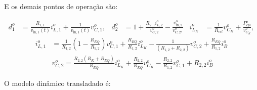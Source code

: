 E os demais pontos de operação são:

\begin{align}
  d_1^o     & = \frac{R_{1,1}}{v_{\text{in}, 1}(t)} i_{L,1}^o + \frac{1}{v_{\text{in}, 1}(t)} v_{C,1}^o, &
  d_2^o     & = 1 + \frac{R_{2,1}i_{L,2}^o}{v_{C,2}^o} - \frac{v_{\text{in},2}^o}{v_{C,2}^o,}                        &
  i_{L_K}^o & = \frac{1}{R_{crl}} v_{C_K}^o + \frac{P_{cpl}^o}{v_{C_K}^o},
\end{align}
\begin{align}
  i_{L,1}^o & = \frac{1}{R_{1,2}} \left(1 - \frac{R_{EQ}}{{R_{1,2}}}\right) v_{C,1}^o + \frac{R_{EQ}}{R_{1,2} } i_{L_K}^o - \frac{1}{ (R_{1,2} + R_{2,2})} v_{C,2}^o + \frac{R_{EQ}}{R_{1,2}} i_B^o\\[12pt]
            & v_{C,2}^o = \frac{R_{2,2}(R_K + R_{EQ})}{R_{EQ}} i_{L_K}^o + \frac{R_{2,2}}{R_{EQ}} v_{C_K}^o - \frac{R_{2,2}}{{R_{1,2}}} v_{C,1}^o + R_{2,2}i_B^o
\end{align}


O modelo dinâmico transladado é:

